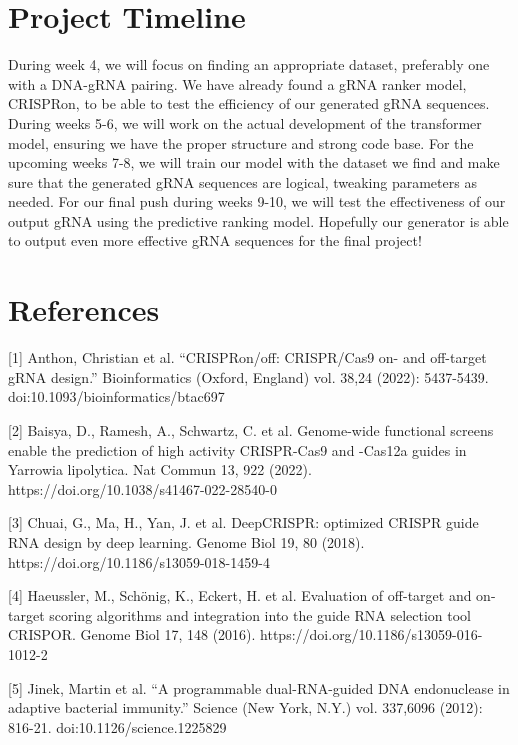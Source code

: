 \documentclass{article}
\begin{document}
\section{Project Timeline}
During week 4, we will focus on finding an appropriate dataset, preferably one with a DNA-gRNA pairing. We have already found a gRNA ranker model, CRISPRon, to be able to test the efficiency of our generated gRNA sequences. During weeks 5-6, we will work on the actual development of the transformer model, ensuring we have the proper structure and strong code base. For the upcoming weeks 7-8, we will train our model with the dataset we find and make sure that the generated gRNA sequences are logical, tweaking parameters as needed. For our final push during weeks 9-10, we will test the effectiveness of our output gRNA using the predictive ranking model. Hopefully our generator is able to output even more effective gRNA sequences for the final project!

\newpage

\section*{References}

\small
\label{Reference 1} [1] Anthon, Christian et al. “CRISPRon/off: CRISPR/Cas9 on- and off-target gRNA design.” Bioinformatics (Oxford, England) vol. 38,24 (2022): 5437-5439. doi:10.1093/bioinformatics/btac697 

\label{Reference 2} [2] Baisya, D., Ramesh, A., Schwartz, C. et al. Genome-wide functional screens enable the prediction of high activity CRISPR-Cas9 and -Cas12a guides in Yarrowia lipolytica. Nat Commun 13, 922 (2022). https://doi.org/10.1038/s41467-022-28540-0

\label{Reference 3} [3] Chuai, G., Ma, H., Yan, J. et al. DeepCRISPR: optimized CRISPR guide RNA design by deep learning. Genome Biol 19, 80 (2018). https://doi.org/10.1186/s13059-018-1459-4

\label{Reference 4} [4] Haeussler, M., Schönig, K., Eckert, H. et al. Evaluation of off-target and on-target scoring algorithms and integration into the guide RNA selection tool CRISPOR. Genome Biol 17, 148 (2016). https://doi.org/10.1186/s13059-016-1012-2

\label{Reference 5} [5] Jinek, Martin et al. “A programmable dual-RNA-guided DNA endonuclease in adaptive bacterial immunity.” Science (New York, N.Y.) vol. 337,6096 (2012): 816-21. doi:10.1126/science.1225829
\end{document}
